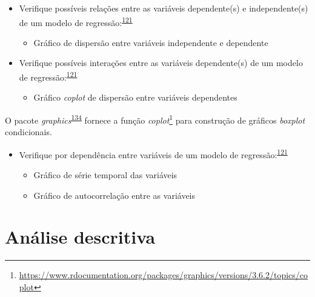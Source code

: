 \documentclass[
  a4paper,
]{book}
\providecommand{\tightlist}{%
  \setlength{\itemsep}{0pt}\setlength{\parskip}{0pt}}
\renewcommand{\href}[2]{#2\footnote{\url{#1}}}
\newenvironment{infobox}[1]
  {
  \begin{itemize}
  \renewcommand{\labelitemi}{
    \raisebox{-.7\height}[0pt][0pt]{
      {\setkeys{Gin}{width=3em,keepaspectratio}
        \texttt{[image: \#1]}}
    }
  }
  \setlength{\fboxsep}{1em}
  \begin{blackbox}
  \item
  }
  {
  \end{blackbox}
  \end{itemize}
  }
\begin{document}
\begin{itemize}
\item
  Verifique possíveis relações entre as variáveis dependente(s) e independente(s) de um modelo de regressão:\textsuperscript{\protect\hyperlink{ref-zuur2009}{121}}

  \begin{itemize}
  \tightlist
  \item
    Gráfico de dispersão entre variáveis independente e dependente
  \end{itemize}
\end{itemize}

\begin{itemize}
\item
  Verifique possíveis interações entre as variáveis dependente(s) de um modelo de regressão:\textsuperscript{\protect\hyperlink{ref-zuur2009}{121}}

  \begin{itemize}
  \tightlist
  \item
    Gráfico \emph{coplot} de dispersão entre variáveis dependentes
  \end{itemize}
\end{itemize}

\begin{infobox}{images/Rlogo}
O pacote \emph{graphics}\textsuperscript{\protect\hyperlink{ref-graphics}{134}} fornece a função \href{https://www.rdocumentation.org/packages/graphics/versions/3.6.2/topics/coplot}{\emph{coplot}} para construção de gráficos \emph{boxplot} condicionais.

\end{infobox}

\begin{itemize}
\item
  Verifique por dependência entre variáveis de um modelo de regressão:\textsuperscript{\protect\hyperlink{ref-zuur2009}{121}}

  \begin{itemize}
  \item
    Gráfico de série temporal das variáveis
  \item
    Gráfico de autocorrelação entre as variáveis
  \end{itemize}
\end{itemize}

\hypertarget{analise-descritiva}{%
\chapter{\texorpdfstring{\textbf{Análise descritiva}}{Análise descritiva}}\label{analise-descritiva}}
\end{document}
